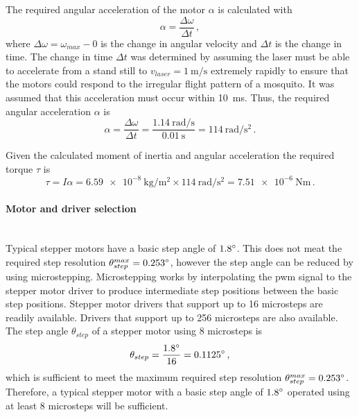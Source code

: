 The required angular acceleration of the motor $\alpha$ is calculated with
\begin{equation}
    \alpha = \frac{\Delta\omega}{\Delta t}\,,
\end{equation}
where $\Delta\omega = \omega_{max} - 0$ is the change in angular velocity and $\Delta t$ is the change in time. The change in time $\Delta t$ was determined by assuming the laser must be able to accelerate from a stand still to $v_{laser} = \SI{1}{\meter\per\second}$ extremely rapidly to ensure that the motors could respond to the irregular flight pattern of a mosquito. It was assumed that this acceleration must occur within 10~ms. Thus, the required angular acceleration $\alpha$ is
\begin{equation}
    \alpha = \frac{\Delta\omega}{\Delta t} = \frac{\SI{1.14}{\radian\per\second}}{\SI{0.01}{\second}} = \SI{114}{\radian\per\second\squared}\,.
\end{equation}

Given the calculated moment of inertia and angular acceleration the required torque $\tau$ is
\begin{equation}
    \tau = I\alpha = \SI{6.59e-8}{\kg\per\meter\squared} \times \SI{114}{\radian\per\second\squared} = \SI{7.51e-6}{\newton\meter}\,.
\end{equation}


\paragraph{Motor and driver selection}\hfill\\
Typical stepper motors have a basic step angle of $1.8^{\circ}$. This does not meat the required step resolution $\theta_{step}^{max} = 0.253^{\circ}$, however the step angle can be reduced by using microstepping. Microstepping works by interpolating the \gls{pwm} signal to the stepper motor driver to produce intermediate step positions between the basic step positions. Stepper motor drivers that support up to 16 microsteps are readily available. Drivers that support up to 256 microsteps are also available. The step angle $\theta_{step}$ of a stepper motor using 8 microsteps is
\begin{equation}
    \theta_{step} = \frac{1.8^{\circ}}{16} = 0.1125^{\circ}\,,
\end{equation}
which is sufficient to meet the maximum required step resolution $\theta_{step}^{max} = 0.253^{\circ}$. Therefore, a typical stepper motor with a basic step angle of $1.8^{\circ}$ operated using at least 8 microsteps will be sufficient.

